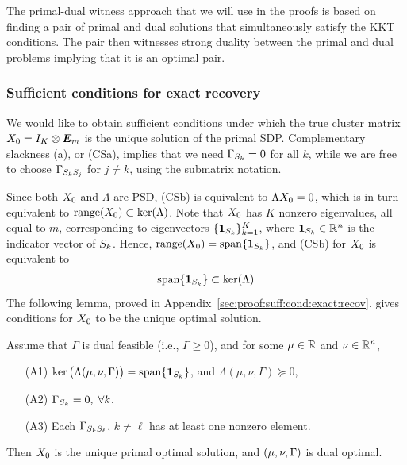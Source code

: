 The primal-dual witness approach that we will use in the proofs is based on finding a pair of primal and dual solutions that simultaneously satisfy the KKT conditions. The pair then witnesses strong duality between the primal and dual problems implying that it is an optimal pair.



\subsubsection{Sufficient conditions for exact recovery}

We would like to obtain sufficient conditions under which the true cluster matrix $X_0 =  I_K \otimes \bm{E}_m$
is the unique solution of the primal SDP. Complementary slackness (a), or (CSa), implies that we need $\Gamma_{S_{k} } = 0$ for all $k$, while we are free to choose $\Gamma_{S_{k}S_{j}}$ for $j\neq k$,  using the submatrix notation.

Since both $X_0$ and $\Lambda$ are PSD, (CSb) is equivalent to $\Lambda X_0 = 0$, which is in turn equivalent to $\operatorname{range}(X_0) \subset \ker(\Lambda)$. Note that $X_0$ has $K$ nonzero eigenvalues, all equal to $m$, corresponding to eigenvectors $\{\bm{1}_{S_{k}}\}_{k=1}^K$, where $\bm{1}_{S_{k}} \in \mathbb{R}^n$ is the indicator vector of $S_{k}$. Hence, $\operatorname{range}(X_0) = \operatorname{span}\{\bm{1}_{S_{k}}\}$, and (CSb) for $X_0$ is equivalent to 
\begin{align*}
  \operatorname{span}\{\bm{1}_{S_{k}}\} \subset \ker(\Lambda)
\end{align*}
The following lemma, proved in Appendix~\ref{sec:proof:suff:cond:exact:recov}, gives conditions for $X_0$ to be the unique optimal solution.



\begin{lem}\label{LEM:SUFF:COND:EXACT:RECOV}
  Assume that $\Gamma$ is dual feasible (i.e., $\Gamma \ge 0$), and for some $\mu \in \mathbb{R}$ and $\nu \in \mathbb{R}^n$,
  \begin{itemize}
    \item[(A1)] $\ker\big(\Lambda(\mu,\nu,\Gamma)\big) = \operatorname{span}\{\bm{1}_{S_{k}}\}$, \; and \; $\Lambda(\mu,\nu,\Gamma) \succeq 0$,
    \item[(A2)] $\Gamma_{S_{k}} = 0,\;\forall k$, 
    \item[(A3)] Each $\Gamma_{S_{k}S_{\ell}}$, $k \neq \ell$ has at least one nonzero element.
  \end{itemize}
  Then $X_0$ is the unique primal optimal solution, and $(\mu,\nu,\Gamma)$ is dual optimal.
\end{lem}


